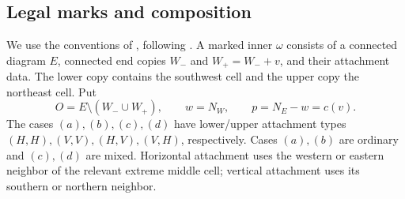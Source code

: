 \documentclass[11pt,a4paper]{amsart}
\numberwithin{equation}{section}
\theoremstyle{plain}
\theoremstyle{definition}
\begin{document}
\subsection{Legal marks and composition}

We use the conventions of \cite{Shields2026Gluing}, following
\cite{McNamara2009Classification}.  A marked inner \(\omega\) consists of a
connected diagram \(E\), connected end copies \(W_-\) and \(W_+=W_-+v\), and their
attachment data.  The lower copy contains the southwest cell and the upper
copy the northeast cell.  Put
\[
 O=E\setminus(W_-\cup W_+),\qquad w=N_W,\qquad p=N_E-w=c(v).
\]
The cases \((a),(b),(c),(d)\) have lower/upper attachment types
\((H,H),(V,V),(H,V),(V,H)\), respectively.  Cases \((a),(b)\) are ordinary and
\((c),(d)\) are mixed.  Horizontal attachment uses the western or eastern neighbor
of the relevant extreme middle cell; vertical attachment uses its southern or
northern neighbor.
\end{document}
